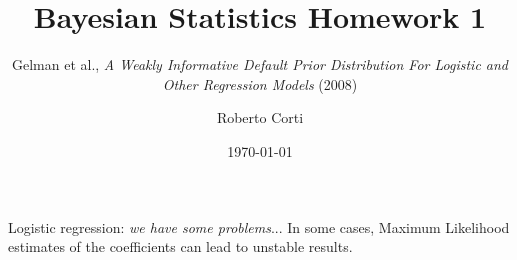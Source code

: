 \documentclass{beamer}
\title{Bayesian Statistics Homework 1}
\subtitle{Gelman et al., \textit{A Weakly Informative Default Prior Distribution For Logistic and Other Regression Models} (2008)}
\author{Roberto Corti}
\date{\today}
\begin{document}
	
	\frame{\titlepage}
	
	\begin{frame}{Logistic regression: \textit{we have some problems}... }
		In some cases, Maximum Likelihood estimates of the coefficients can lead to unstable results.
		
	
	
		
	\end{frame}
	
\end{document}
